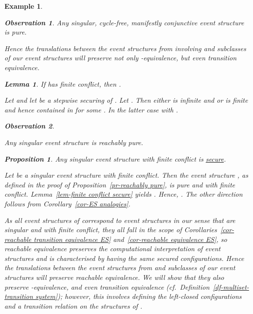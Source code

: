 \documentclass[twocolumn]{article}
\newtheorem{prop}{Proposition}[section]
\newtheorem{lemm}{Lemma}
\newtheorem{obs}{Observation}[section]
\newtheorem{exam}{Example}
\newenvironment{proposition}[1]{\begin{prop} \rm \label{pr-#1} }{\end{prop}}
\newenvironment{lemma}[1]{\begin{lemm} \rm \label{lem-#1} }{\end{lemm}}
\newenvironment{observation}[1]{\begin{obs} \rm \label{obs-#1} }{\end{obs}}
\newenvironment{example}[1]{\begin{exam} \rm \label{ex-#1} }{\end{exam}}
\newenvironment{proof}{\begin{trivlist} \item[\hspace{\labelsep}\bf
Proof:]}{\hfill \end{trivlist}}
\newcommand{\df}[1]{Definition~\ref{df-#1}}
\newcommand{\pr}[1]{Proposition~\ref{pr-#1}}
\newcommand{\lem}[1]{Lemma~\ref{lem-#1}}
\newcommand{\cor}[1]{Corollary~\ref{cor-#1}}
\begin{document}
\begin{example}{causality}
\begin{observation}{manifestly conjunctive}
Any singular, cycle-free, manifestly conjunctive event structure is pure.
\end{observation}
Hence the translations between the event structures from
\cite{NPW81,Wi87a,Wi89} involving  and subclasses of our event
structures will preserve not only -equivalence, but even transition
equivalence.

\begin{lemma}{finite conflict secure}
If  has finite conflict, then .
\end{lemma}
\begin{proof}
Let  and let  be a stepwise securing of .
Let . Then either  is infinite and  or
 is finite and hence contained in  for some .
In the latter case  with .
\end{proof}

\begin{observation}{singular}~\vspace{-6pt}
\item Any singular event structure is reachably pure.
\end{observation}

\begin{proposition}{finite conflict secure}
Any singular event structure with finite conflict is \hyperref[secure]{secure}.
\end{proposition}
\begin{proof}
Let  be a singular event structure with finite conflict.
Then the event structure , as defined in the proof of
\pr{reachably pure}, is pure and with finite conflict. \lem{finite
conflict secure} yields .  Hence,
.
The other direction follows from \cor{ES analogies}.
\end{proof}
As all event structures of \cite{NPW81,Wi87a,Wi89} correspond to event
structures in our sense that are singular and with finite conflict,
they all fall in the scope of Corollaries~\ref{cor-reachable
transition equivalence ES} and~\ref{cor-reachable equivalence ES}, so
reachable equivalence preserves the computational interpretation of
event structures and is characterised by having the same secured
configurations. Hence the translations between the event structures
from \cite{Wi87a,Wi89} and subclasses of our event structures will
preserve reachable equivalence. We will show that they also preserve
-equivalence, and even transition equivalence
(cf.~\df{multiset-transition system}); however, this involves {\em
defining} the left-closed configurations and a transition relation on
the structures of \cite{Wi87a,Wi89}.


\end{example}
\end{document}
